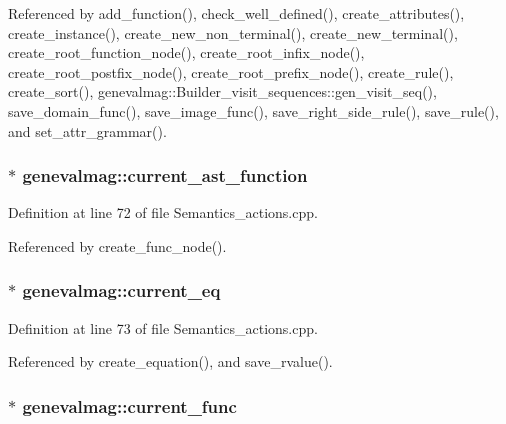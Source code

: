 Referenced by add\_\-function(), check\_\-well\_\-defined(), create\_\-attributes(), create\_\-instance(), create\_\-new\_\-non\_\-terminal(), create\_\-new\_\-terminal(), create\_\-root\_\-function\_\-node(), create\_\-root\_\-infix\_\-node(), create\_\-root\_\-postfix\_\-node(), create\_\-root\_\-prefix\_\-node(), create\_\-rule(), create\_\-sort(), genevalmag::Builder\_\-visit\_\-sequences::gen\_\-visit\_\-seq(), save\_\-domain\_\-func(), save\_\-image\_\-func(), save\_\-right\_\-side\_\-rule(), save\_\-rule(), and set\_\-attr\_\-grammar().\hypertarget{namespacegenevalmag_5d3b27c53cfad3c612dc56f1750c44a2}{
\subsubsection[{current\_\-ast\_\-function}]{$\ast$ {\bf genevalmag::current\_\-ast\_\-function}}}
\label{namespacegenevalmag_5d3b27c53cfad3c612dc56f1750c44a2}




Definition at line 72 of file Semantics\_\-actions.cpp.

Referenced by create\_\-func\_\-node().\hypertarget{namespacegenevalmag_d81ea3b166738b52ec4a3b7ac291e64b}{
\subsubsection[{current\_\-eq}]{$\ast$ {\bf genevalmag::current\_\-eq}}}
\label{namespacegenevalmag_d81ea3b166738b52ec4a3b7ac291e64b}




Definition at line 73 of file Semantics\_\-actions.cpp.

Referenced by create\_\-equation(), and save\_\-rvalue().\hypertarget{namespacegenevalmag_910b57b31dc9d8772d89a082d88f0c50}{
\subsubsection[{current\_\-func}]{$\ast$ {\bf genevalmag::current\_\-func}}}
\label{namespacegenevalmag_910b57b31dc9d8772d89a082d88f0c50}


